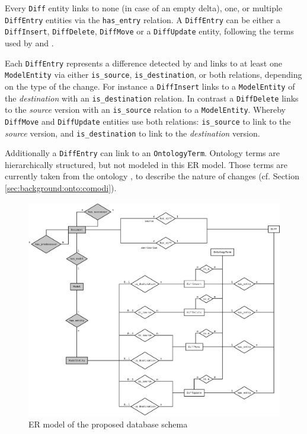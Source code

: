 Every \texttt{Diff} entity links to none  (in case of an empty delta), one, or multiple \texttt{DiffEntry} entities via the \texttt{has\_entry} relation.  
A \texttt{DiffEntry} can be either a \texttt{DiffInsert},  \texttt{DiffDelete}, \texttt{DiffMove} or a \texttt{DiffUpdate} entity, following the terms used by \bives \citep{Scharm2015} and \comodi \citep{Scharm2016}.

Each \texttt{DiffEntry} represents a difference detected by \bives \citep{Scharm2015} and links to at least one \texttt{ModelEntity} via either \texttt{is\_source}, \texttt{is\_destination}, or both relations, depending on the type of the change.
For instance a \texttt{DiffInsert} links to a \texttt{ModelEntity} of the \emph{destination} with an \texttt{is\_destination} relation.
In contrast a \texttt{DiffDelete} links to the \emph{source} version with an \texttt{is\_source} relation to a \texttt{ModelEntity}. Whereby \texttt{DiffMove} and \texttt{DiffUpdate} entities use both relations: \texttt{is\_source} to link to the \emph{source} version, and \texttt{is\_destination} to link to the \emph{destination} version.

Additionally a \texttt{DiffEntry} can link to an \texttt{OntologyTerm}. Ontology terms are hierarchically structured, but not modeled in this ER model. Those terms are currently taken from the \comodi ontology \citep{Scharm2016}, to describe the nature of changes (cf. Section \ref{sec:background:onto:comodi}).



\begin{figure}
	\centering
	\includegraphics[width=\textwidth]{resources/db-concept-er.pdf}
	\caption{ER model of the proposed database schema}
	\label{fig:db-er-model}
\end{figure}

